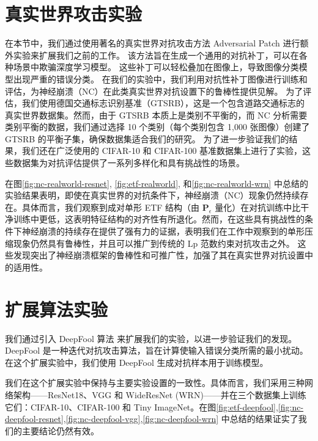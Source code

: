 \section{真实世界攻击实验}

在本节中，我们通过使用著名的真实世界对抗攻击方法 Adversarial Patch \cite{DBLP:journals/corr/abs-1712-09665} 进行额外实验来扩展我们之前的工作。
该方法旨在生成一个通用的对抗补丁，可以在各种场景中欺骗深度学习模型。
这些补丁可以轻松叠加在图像上，导致图像分类模型出现严重的错误分类。 
在我们的实验中，我们利用对抗性补丁图像进行训练和评估，为神经崩溃（NC）在此类真实世界对抗设置下的鲁棒性提供见解。 
为了评估，我们使用德国交通标志识别基准（GTSRB），这是一个包含道路交通标志的真实世界数据集。然而，由于 GTSRB 本质上是类别不平衡的，而 NC 分析需要类别平衡的数据，我们通过选择 10 个类别（每个类别包含 1,000 张图像）创建了 GTSRB 的平衡子集，确保数据集适合我们的研究。
为了进一步验证我们的结果，我们还在广泛使用的 CIFAR-10 和 CIFAR-100 基准数据集上进行了实验，这些数据集为对抗评估提供了一系列多样化和具有挑战性的场景。 

在图\ref{fig:nc-realworld-resnet}, \ref{fig:etf-realworld}, 和\ref{fig:nc-realworld-wrn} 中总结的实验结果表明，即使在真实世界的对抗条件下，神经崩溃（NC）现象仍然持续存在。具体而言，我们观察到成对单形 ETF 结构（由 $\boldsymbol{P}_{\epsilon}$ 量化）在对抗训练中比干净训练中更低，这表明特征结构的对齐性有所退化。然而，在这些具有挑战性的条件下神经崩溃的持续存在提供了强有力的证据，表明我们在工作中观察到的单形压缩现象仍然具有鲁棒性，并且可以推广到传统的 Lp 范数约束对抗攻击之外。
这些发现突出了神经崩溃框架的鲁棒性和可推广性，加强了其在真实世界对抗设置中的适用性。


\section{扩展算法实验}

我们通过引入 DeepFool 算法 \cite{DBLP:conf/cvpr/Moosavi-Dezfooli16} 来扩展我们的实验，以进一步验证我们的发现。DeepFool 是一种迭代对抗攻击算法，旨在计算使输入错误分类所需的最小扰动。在这个扩展实验中，我们使用 DeepFool 生成对抗样本用于训练模型。

我们在这个扩展实验中保持与主要实验设置的一致性。具体而言，我们采用三种网络架构——ResNet18、VGG 和 WideResNet (WRN)——并在三个数据集上训练它们：CIFAR-10、CIFAR-100 和 Tiny ImageNet。在图\ref{fig:etf-deepfool},\ref{fig:nc-deepfool-resnet},\ref{fig:nc-deepfool-vgg},\ref{fig:nc-deepfool-wrn} 中总结的结果证实了我们的主要结论仍然有效。

